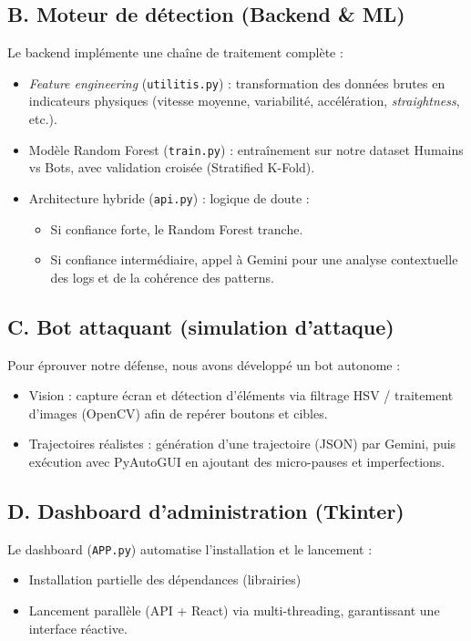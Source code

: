 \documentclass[a4paper, 12pt, twoside]{article}
\begin{document}
\subsection*{B. Moteur de détection (Backend \& ML)}
Le backend implémente une chaîne de traitement complète :
\begin{itemize}
    \item \textit{Feature engineering} (\texttt{utilitis.py}) : transformation des données brutes en indicateurs physiques (vitesse moyenne, variabilité, accélération, \textit{straightness}, etc.).
    \item Modèle Random Forest (\texttt{train.py}) : entraînement sur notre dataset Humains vs Bots, avec validation croisée (Stratified K-Fold).
    \item Architecture hybride (\texttt{api.py}) : logique de doute :
    \begin{itemize}
        \item Si confiance forte, le Random Forest tranche.
        \item Si confiance intermédiaire, appel à Gemini pour une analyse contextuelle des logs et de la cohérence des patterns.
    \end{itemize}
\end{itemize}

\subsection*{C. Bot attaquant (simulation d'attaque)}
Pour éprouver notre défense, nous avons développé un bot autonome :
\begin{itemize}
    \item Vision : capture écran et détection d'éléments via filtrage HSV / traitement d'images (OpenCV) afin de repérer boutons et cibles.
    \item Trajectoires réalistes : génération d'une trajectoire (JSON) par Gemini, puis exécution avec PyAutoGUI en ajoutant des micro-pauses et imperfections.
\end{itemize}

\subsection*{D. Dashboard d'administration (Tkinter)}
Le dashboard (\texttt{APP.py}) automatise l'installation et le lancement :
\begin{itemize}
    \item Installation partielle des dépendances (librairies)
    \item Lancement parallèle (API + React) via multi-threading, garantissant une interface réactive.
\end{itemize}
\end{document}
